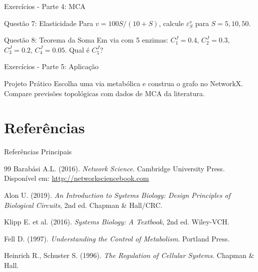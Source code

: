 \begin{frame}[shrink=15]{Exercícios - Parte 4: MCA}
\begin{block}{Questão 7: Elasticidade}
Para $v = 100S / (10 + S)$, calcule $\varepsilon_S^v$ para $S=5, 10, 50$.
\end{block}

\begin{block}{Questão 8: Teorema da Soma}
Em via com 5 enzimas: $C_1^J = 0.4$, $C_2^J = 0.3$, $C_3^J = 0.2$, $C_4^J = 0.05$. Qual é $C_5^J$?
\end{block}
\end{frame}

\begin{frame}[shrink=20]{Exercícios - Parte 5: Aplicação}
\begin{alertblock}{Projeto Prático}
Escolha uma via metabólica e construa o grafo no NetworkX. Compare previsões topológicas com dados de MCA da literatura.
\end{alertblock}
\end{frame}

\section{Referências}

\begin{frame}{Referências Principais}
\begin{thebibliography}{99}
 Barabási A.L. (2016). \textit{Network Science}. Cambridge University Press. Disponível em: \url{http://networksciencebook.com}

 Alon U. (2019). \textit{An Introduction to Systems Biology: Design Principles of Biological Circuits}, 2nd ed. Chapman \& Hall/CRC.

 Klipp E. et al. (2016). \textit{Systems Biology: A Textbook}, 2nd ed. Wiley-VCH.

 Fell D. (1997). \textit{Understanding the Control of Metabolism}. Portland Press.

 Heinrich R., Schuster S. (1996). \textit{The Regulation of Cellular Systems}. Chapman \& Hall.
\end{thebibliography}
\end{frame}

